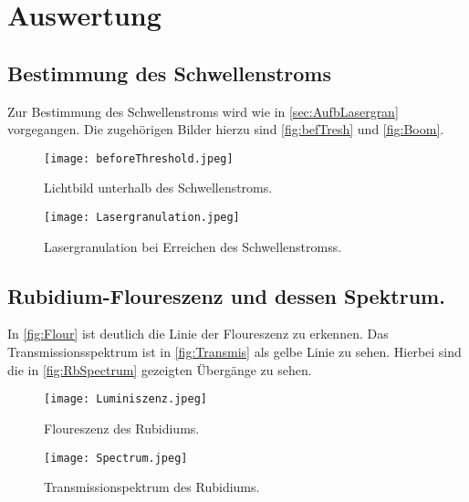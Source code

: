 \section{Auswertung}
\label{sec:Auswertung}

%
\subsection{Bestimmung des Schwellenstroms}
\label{sec:Ausw1}
Zur Bestimmung des Schwellenstroms wird wie in \autoref{sec:AufbLasergran} vorgegangen. Die zugehörigen Bilder hierzu sind \autoref{fig:befTresh} und \autoref{fig:Boom}.

\begin{figure}
    \centering
        \texttt{[image: beforeThreshold.jpeg]}
        \caption{Lichtbild unterhalb des Schwellenstroms.}
        \label{fig:befTresh} 
\end{figure}
\begin{figure}
    \centering
        \texttt{[image: Lasergranulation.jpeg]}
        \caption{Lasergranulation bei Erreichen des Schwellenstromss.}
        \label{fig:Boom} 
\end{figure}

\subsection{Rubidium-Floureszenz und dessen Spektrum.}
\label{sec:Ausw2}
In \autoref{fig:Flour} ist deutlich die Linie der Floureszenz zu erkennen. Das Transmissionsspektrum ist in \autoref{fig:Transmis} als gelbe Linie zu sehen. Hierbei sind die in \autoref{fig:RbSpectrum} gezeigten Übergänge zu sehen.

\begin{figure}
    \centering
        \texttt{[image: Luminiszenz.jpeg]}
        \caption{Floureszenz des Rubidiums.}
        \label{fig:Flour} 
\end{figure}

\begin{figure}
    \centering
        \texttt{[image: Spectrum.jpeg]}
        \caption{Transmissionspektrum des Rubidiums.}
        \label{fig:Transmis} 
\end{figure}